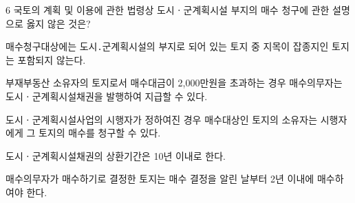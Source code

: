 \begin{question}{6}
국토의 계획 및 이용에 관한 법령상 도시ㆍ군계획시설 부지의 매수 청구에 관한 설명으로 옳지 않은 것은?
\begin{choices}
  \item 매수청구대상에는 도시․군계획시설의 부지로 되어 있는 토지 중 지목이 잡종지인 토지는 포함되지 않는다.
  \item 부재부동산 소유자의 토지로서 매수대금이 2,000만원을 초과하는 경우 매수의무자는 도시ㆍ군계획시설채권을 발행하여 지급할 수 있다.
  \item 도시ㆍ군계획시설사업의 시행자가 정하여진 경우 매수대상인 토지의 소유자는 시행자에게 그 토지의 매수를 청구할 수 있다.
  \item 도시ㆍ군계획시설채권의 상환기간은 10년 이내로 한다.
  \item 매수의무자가 매수하기로 결정한 토지는 매수 결정을 알린 날부터 2년 이내에 매수하여야 한다.
\end{choices}
\end{question}
